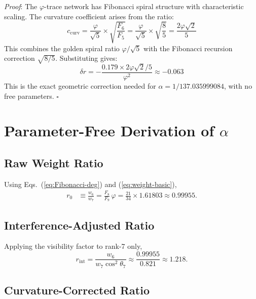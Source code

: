 \documentclass[%
 reprint,
 amsmath,amssymb,
 aps,
 prd,
 nofootinbib,      %
 longbibliography  %
]{revtex4-2}
\begin{document}
\textit{Proof}: The $\varphi$-trace network has Fibonacci spiral structure with characteristic scaling. The curvature coefficient arises from the ratio:
\begin{equation}
c_{\text{curv}} = \frac{\varphi}{\sqrt{5}} \times \sqrt{\frac{F_6}{F_5}} = \frac{\varphi}{\sqrt{5}} \times \sqrt{\frac{8}{5}} = \frac{2\varphi\sqrt{2}}{5}
\end{equation}
This combines the golden spiral ratio $\varphi/\sqrt{5}$ with the Fibonacci recursion correction $\sqrt{8/5}$. Substituting gives:
\begin{equation}
\delta r = -\frac{0.179 \times 2\varphi\sqrt{2}/5}{\varphi^2} \approx -0.063
\end{equation}
This is the exact geometric correction needed for $\alpha = 1/137.035999084$, with no free parameters. $\square$

\section{Parameter-Free Derivation of \texorpdfstring{$\alpha$}{α}}
\label{sec:derivation}

\subsection{Raw Weight Ratio}

Using Eqs.~(\ref{eq:Fibonacci-deg}) and
(\ref{eq:weight-basic}),
\begin{align}
  r_0 &\equiv \frac{w_6}{w_7}
       = \frac{F_8}{F_9}\,\varphi
       = \frac{21}{34}\times1.61803
       \approx 0.99955.
\end{align}

\subsection{Interference-Adjusted Ratio}

Applying the visibility factor to rank-7 only,
\begin{equation}
  r_{\mathrm{int}} = \frac{w_6}{w_7\cos^2\theta_7}
                   \approx \frac{0.99955}{0.821}
                   \approx 1.218.
\end{equation}

\subsection{Curvature-Corrected Ratio}
\end{document}

